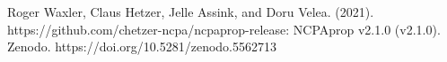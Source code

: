 \documentclass[10pt]{article}
\begin{document}
\vspace*{\fill}

\noindent\makebox[\linewidth]{\rule{\linewidth}{0.4pt}}

\noindent Roger Waxler, Claus Hetzer, Jelle Assink, and Doru Velea. (2021). https://github.com/chetzer-ncpa/ncpaprop-release: NCPAprop v2.1.0 (v2.1.0). Zenodo. https://doi.org/10.5281/zenodo.5562713

\newpage


\vspace*{20pt}

%
\newpage
\tableofcontents
\newpage


\newpage

\newpage

\newpage

\newpage

\newpage
%

\newpage
%
%

\newpage
%
%

\newpage


\end{document}

